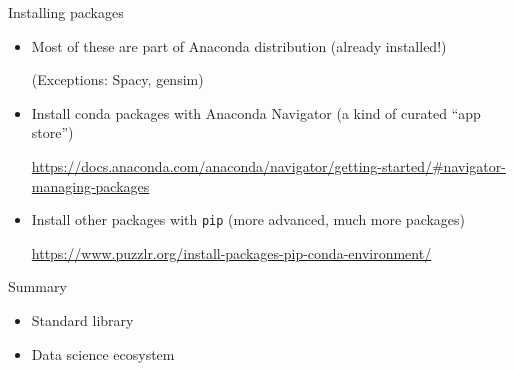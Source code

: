 \documentclass[aspectratio=169,usenames,dvipsnames]{beamer}
\begin{document}
\begin{frame}{Installing packages}
    \begin{itemize}
        \item Most of these are part of Anaconda distribution (already installed!)

			(Exceptions: Spacy, gensim)
        \item Install conda packages with Anaconda Navigator
			(a kind of curated ``app store'')

            \url{https://docs.anaconda.com/anaconda/navigator/getting-started/\#navigator-managing-packages}

        \item Install other packages with \texttt{pip}
			(more advanced, much more packages)

            \url{https://www.puzzlr.org/install-packages-pip-conda-environment/}
    \end{itemize}
\end{frame}


\begin{frame}{Summary}
    \begin{itemize}
        \item Standard library
        \item Data science ecosystem
    \end{itemize}
\end{frame}
\end{document}
